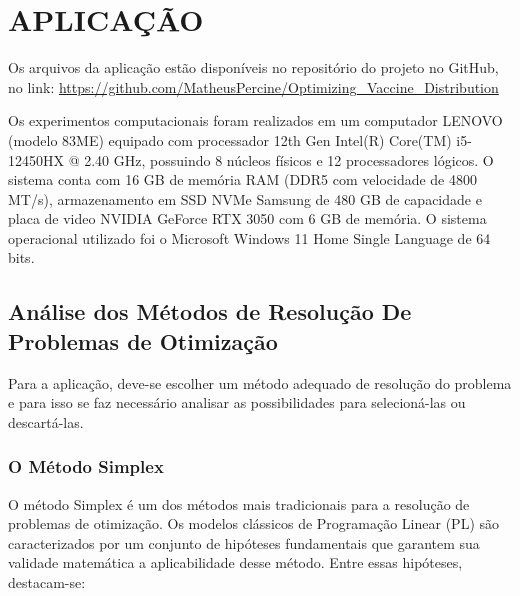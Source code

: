\chapter{APLICAÇÃO}

Os arquivos da aplicação estão disponíveis no repositório do projeto no GitHub, no link: \url{https://github.com/MatheusPercine/Optimizing_Vaccine_Distribution}

Os experimentos computacionais foram realizados em um computador LENOVO (modelo 83ME) equipado com processador 12th Gen Intel(R) Core(TM) i5-12450HX @ 2.40 GHz, possuindo 8 núcleos físicos e 12 processadores lógicos. O sistema conta com 16 GB de memória RAM (DDR5 com velocidade de 4800 MT/s), armazenamento em SSD NVMe Samsung de 480 GB de capacidade e placa de video NVIDIA GeForce RTX 3050 com 6 GB de memória. O sistema operacional utilizado foi o Microsoft Windows 11 Home Single Language de 64 bits.

\section{Análise dos Métodos de Resolução De Problemas de Otimização}

Para a aplicação, deve-se escolher um método adequado de resolução do problema e para isso se faz necessário analisar as possibilidades para selecioná-las ou descartá-las.

\subsection{O Método Simplex}

O método Simplex é um dos métodos mais tradicionais para a resolução de problemas de otimização. Os modelos clássicos de Programação Linear (PL) são caracterizados por um conjunto de hipóteses fundamentais que garantem sua validade matemática a aplicabilidade desse método. Entre essas hipóteses, destacam-se: 

